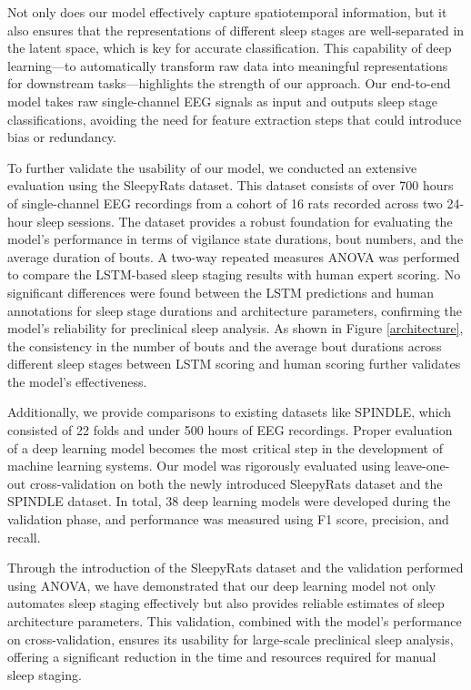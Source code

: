 \documentclass[pdflatex,sn-mathphys-num]{sn-jnl}%
\theoremstyle{thmstyleone}%
\theoremstyle{thmstyletwo}%
\theoremstyle{thmstylethree}%
\begin{document}
Not only does our model effectively capture spatiotemporal information, but it also ensures that the representations of different sleep stages are well-separated in the latent space, which is key for accurate classification. This capability of deep learning—to automatically transform raw data into meaningful representations for downstream tasks—highlights the strength of our approach. Our end-to-end model takes raw single-channel EEG signals as input and outputs sleep stage classifications, avoiding the need for feature extraction steps that could introduce bias or redundancy.

To further validate the usability of our model, we conducted an extensive evaluation using the SleepyRats dataset. This dataset consists of over 700 hours of single-channel EEG recordings from a cohort of 16 rats recorded across two 24-hour sleep sessions. The dataset provides a robust foundation for evaluating the model's performance in terms of vigilance state durations, bout numbers, and the average duration of bouts. A two-way repeated measures ANOVA was performed to compare the LSTM-based sleep staging results with human expert scoring. No significant differences were found between the LSTM predictions and human annotations for sleep stage durations and architecture parameters, confirming the model's reliability for preclinical sleep analysis. As shown in Figure \ref{architecture}, the consistency in the number of bouts and the average bout durations across different sleep stages between LSTM scoring and human scoring further validates the model's effectiveness.

Additionally, we provide comparisons to existing datasets like SPINDLE, which consisted of 22 folds and under 500 hours of EEG recordings. Proper evaluation of a deep learning model becomes the most critical step in the development of machine learning systems. Our model was rigorously evaluated using leave-one-out cross-validation on both the newly introduced SleepyRats dataset and the SPINDLE dataset. In total, 38 deep learning models were developed during the validation phase, and performance was measured using F1 score, precision, and recall.

Through the introduction of the SleepyRats dataset and the validation performed using ANOVA, we have demonstrated that our deep learning model not only automates sleep staging effectively but also provides reliable estimates of sleep architecture parameters. This validation, combined with the model's performance on cross-validation, ensures its usability for large-scale preclinical sleep analysis, offering a significant reduction in the time and resources required for manual sleep staging.
\end{document}

